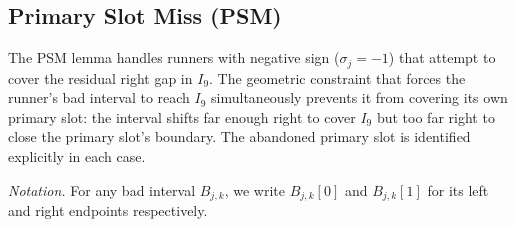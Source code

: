 \documentclass[12pt]{article}
\begin{document}
\subsection{Primary Slot Miss (PSM)}

The PSM lemma handles runners with negative sign ($\sigma_j=-1$) that attempt to cover the
residual right gap in $I_9$. The geometric constraint that forces the runner's bad interval
to reach $I_9$ simultaneously prevents it from covering its own primary slot: the interval
shifts far enough right to cover $I_9$ but too far right to close the primary slot's
boundary. The abandoned primary slot is identified explicitly in each case.

\emph{Notation.} For any bad interval $B_{j,k}$, we write $B_{j,k}[0]$ and
$B_{j,k}[1]$ for its left and right endpoints respectively.
\end{document}
